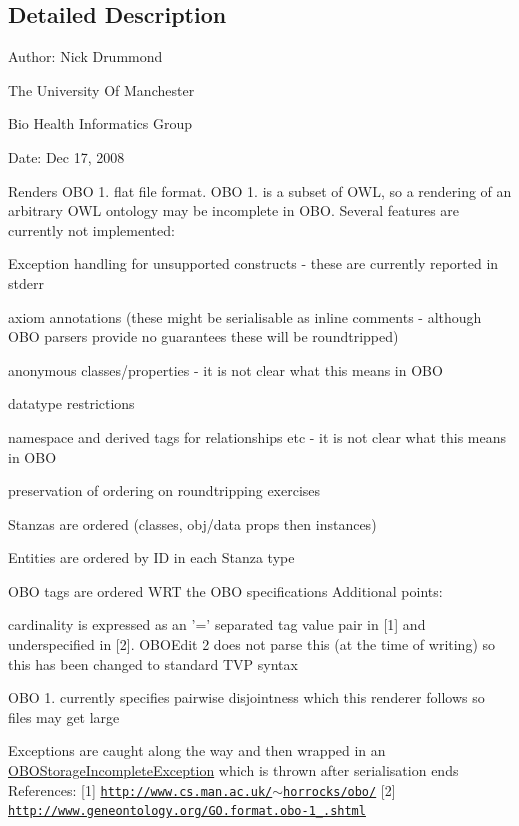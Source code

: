 \subsection{Detailed Description}
Author\-: Nick Drummond\par
 The University Of Manchester\par
 Bio Health Informatics Group\par
 Date\-: Dec 17, 2008\par
\par
 Renders O\-B\-O 1. flat file format. O\-B\-O 1. is a subset of O\-W\-L, so a rendering of an arbitrary O\-W\-L ontology may be incomplete in O\-B\-O. Several features are currently not implemented\-:
\begin{DoxyItemize}
\item Exception handling for unsupported constructs -\/ these are currently reported in stderr
\item axiom annotations (these might be serialisable as inline comments -\/ although O\-B\-O parsers provide no guarantees these will be roundtripped)
\item anonymous classes/properties -\/ it is not clear what this means in O\-B\-O
\item datatype restrictions
\item namespace and derived tags for relationships etc -\/ it is not clear what this means in O\-B\-O
\item preservation of ordering on roundtripping exercises
\item Stanzas are ordered (classes, obj/data props then instances)
\item Entities are ordered by I\-D in each Stanza type
\item O\-B\-O tags are ordered W\-R\-T the O\-B\-O specifications Additional points\-:
\item cardinality is expressed as an '=' separated tag value pair in \mbox{[}1\mbox{]} and underspecified in \mbox{[}2\mbox{]}. O\-B\-O\-Edit 2 does not parse this (at the time of writing) so this has been changed to standard T\-V\-P syntax
\item O\-B\-O 1. currently specifies pairwise disjointness which this renderer follows so files may get large
\item Exceptions are caught along the way and then wrapped in an \hyperlink{classorg_1_1coode_1_1owlapi_1_1obo_1_1renderer_1_1_o_b_o_storage_incomplete_exception}{O\-B\-O\-Storage\-Incomplete\-Exception} which is thrown after serialisation ends References\-: \mbox{[}1\mbox{]} \href{http://www.cs.man.ac.uk/~horrocks/obo/}{\tt http\-://www.\-cs.\-man.\-ac.\-uk/$\sim$horrocks/obo/} \mbox{[}2\mbox{]} \href{http://www.geneontology.org/GO.format.obo-1_2.shtml}{\tt http\-://www.\-geneontology.\-org/\-G\-O.\-format.\-obo-\/1\-\_.\-shtml} 
\end{DoxyItemize}

